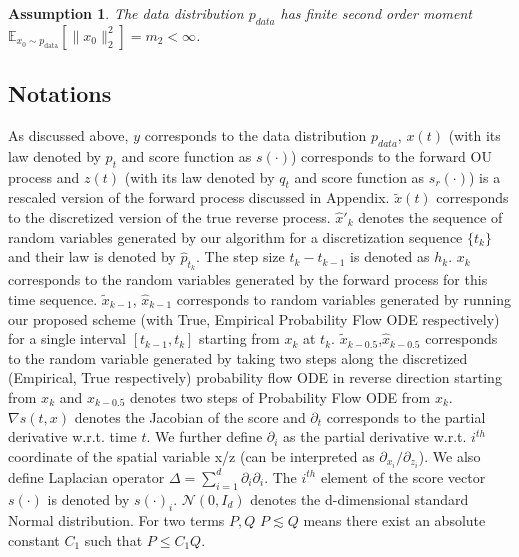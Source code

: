 \documentclass{article}
\newtheorem{assumption}{Assumption}[section]
\begin{document}
\begin{assumption}
\label{finite_moment}
    The data distribution $p_{data}$ has finite second order moment $\mathbb{E}_{x_0 \sim p_{\text{data}}} \left[ \|x_0\|_2^2 \right] = m_2 < \infty$.
\end{assumption}

\subsection{Notations}
\label{notations}
\noindent
 As discussed above, $y$ corresponds to the data distribution $p_{data}$, $x(t)$ (with its law denoted by $p_t$ and score function as $s(\cdot)$) corresponds to the forward OU process and $z(t)$ (with its law denoted by $q_t$ and score function as $s_r(\cdot)$) is a rescaled version of the forward process discussed in Appendix. $\tilde{x}(t)$ corresponds to the discretized version of the true reverse process. $\hat{x}'_k$ denotes the sequence of random variables generated by our algorithm for a  discretization sequence $\{t_k\}$ and  their law is denoted by $\hat{p}_{t_k}$. The step size $t_k-t_{k-1}$ is denoted as $h_k$. $x_k$ corresponds to the random variables generated by the forward process for this time sequence. $\tilde{x}_{k-1}$, $\hat{x}_{k-1}$ corresponds to random variables generated by running our proposed scheme (with True, Empirical Probability Flow ODE respectively) for a single interval $[t_{k-1},t_k]$ starting from $x_k$ at $t_k$. 
 $\tilde{x}_{k-0.5}$,$\hat{x}_{k-0.5}$ corresponds to the random variable generated by taking two steps along the discretized (Empirical, True respectively) probability flow ODE in reverse direction  starting from ${x}_{k}$ and $x_{k-0.5}$ denotes two steps of Probability Flow ODE from $x_k$.
$\nabla s(t,x)$ denotes the Jacobian of the score and $\partial_t$ corresponds to the partial derivative w.r.t. time $t$. We further define $\partial_i$ as the partial derivative w.r.t. $i^{th}$ coordinate of the spatial variable x/z (can be interpreted as $\partial_{x_i}/\partial_{z_i}$). We also define Laplacian operator $\Delta = \sum_{i=1}^d\partial_i\partial_i$. The $i^{th}$ element of the score vector $s(\cdot)$ is denoted by $s(\cdot)_i$. $\mathcal{N}(0,I_d)$ denotes the d-dimensional standard Normal distribution.
For two terms $P, Q$ $P\lesssim Q$ means there exist an absolute constant $C_1$ such that $P \leq C_1 Q$.
\end{document}
